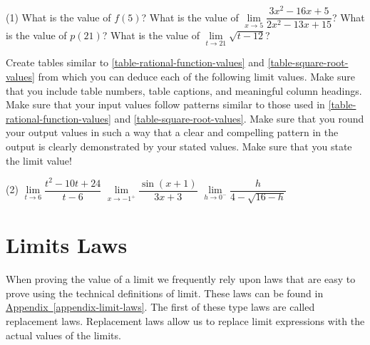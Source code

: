 \documentclass[12pt,]{book}
\theoremstyle{plain}
\theoremstyle{definition}
\theoremstyle{definition}
\theoremstyle{definition}
\theoremstyle{definition}
\theoremstyle{definition}
\numberwithin{equation}{section}
\newcommand{\fe}[2]{#1\mathopen{}\left(#2\right)\mathclose{}}
\begin{document}
\begin{exercisegroup}(1)
\exercise[14.]\hypertarget{exercise-59}{}What is the value of \(\fe{f}{5}\)?%
\exercise[15.]\hypertarget{exercise-60}{}What is the value of \(\lim\limits_{x\to5}\dfrac{3x^2-16x+5}{2x^2-13x+15}\)?%
\exercise[16.]\hypertarget{exercise-61}{}What is the value of \(\fe{p}{21}\)?%
\exercise[17.]\hypertarget{exercise-62}{}What is the value of \(\lim\limits_{t\to21}\sqrt{t-12}\)?%
\end{exercisegroup}
\par\smallskip\noindent
\hypertarget{exercisegroup-15}{}\par\noindent Create tables similar to \hyperref[table-rational-function-values]{\ref{table-rational-function-values}} and \hyperref[table-square-root-values]{\ref{table-square-root-values}} from which you can deduce each of the following limit values. Make sure that you include table numbers, table captions, and meaningful column headings. Make sure that your input values follow patterns similar to those used in \hyperref[table-rational-function-values]{\ref{table-rational-function-values}} and \hyperref[table-square-root-values]{\ref{table-square-root-values}}. Make sure that you round your output values in such a way that a clear and compelling pattern in the output is clearly demonstrated by your stated values. Make sure that you state the limit value!%
\begin{exercisegroup}(2)
\exercise[18.]\hypertarget{exercise-63}{}\(\lim\limits_{t\to6}\dfrac{t^2-10t+24}{t-6}\)%
\exercise[19.]\hypertarget{exercise-64}{}\(\lim\limits_{x\to-1^{+}}\dfrac{\sin(x+1)}{3x+3}\)%
\exercise[20.]\hypertarget{exercise-65}{}\(\lim\limits_{h\to0^{-}}\dfrac{h}{4-\sqrt{16-h}}\)%
\end{exercisegroup}
\par\smallskip\noindent
\typeout{************************************************}
\typeout{************************************************}
\section[{Limits Laws}]{Limits Laws}\label{section-limit-laws}
When proving the value of a limit we frequently rely upon laws that are easy to prove using the technical definitions of limit. These laws can be found in \hyperref[appendix-limit-laws]{Appendix~\ref{appendix-limit-laws}}. The first of these type laws are called replacement laws. Replacement laws allow us to replace limit expressions with the actual values of the limits.%
\typeout{************************************************}
\typeout{************************************************}
\end{document}
